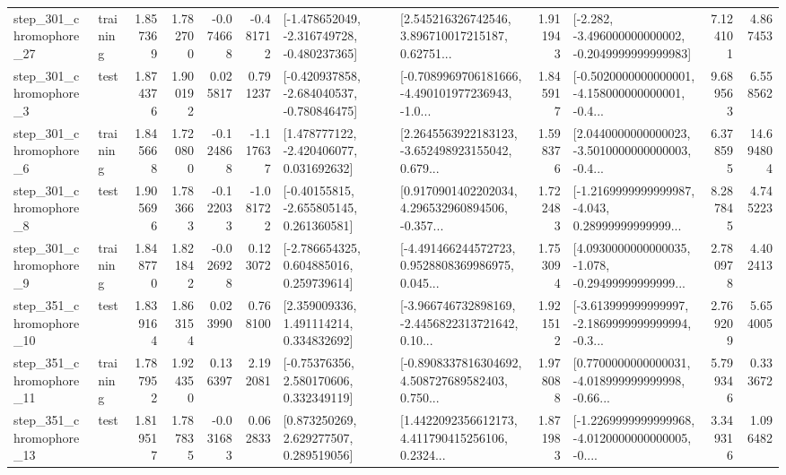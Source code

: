 \begin{tabular}{llrrrrllrlrr}
  step\_301\_chromophore\_27 &  training &      1.857369 &    1.782700 &     -0.074668 & -0.481712 &  [-1.478652049, -2.316749728, -0.480237365] &  [2.545216326742546, 3.896710017215187, 0.62751... &       1.911943 &  [-2.282, -3.496000000000002, -0.2049999999999983] &            7.124101 &          4.867453 \\
   step\_301\_chromophore\_3 &      test &      1.874376 &    1.900192 &      0.025817 &  0.791237 &  [-0.420937858, -2.684040537, -0.780846475] &  [-0.7089969706181666, -4.490101977236943, -1.0... &       1.845917 &  [-0.5020000000000001, -4.158000000000001, -0.4... &            9.689563 &          6.558562 \\
   step\_301\_chromophore\_6 &  training &      1.845668 &    1.720800 &     -0.124868 & -1.117637 &    [1.478777122, -2.420406077, 0.031692632] &  [2.2645563922183123, -3.652498923155042, 0.679... &       1.598376 &  [2.0440000000000023, -3.5010000000000003, -0.4... &            6.378595 &         14.694804 \\
   step\_301\_chromophore\_8 &      test &      1.905696 &    1.783663 &     -0.122033 & -1.081722 &    [-0.40155815, -2.655805145, 0.261360581] &  [0.9170901402202034, 4.296532960894506, -0.357... &       1.722483 &  [-1.2169999999999987, -4.043, 0.28999999999999... &            8.287845 &          4.745223 \\
   step\_301\_chromophore\_9 &  training &      1.848770 &    1.821842 &     -0.026928 &  0.123072 &    [-2.786654325, 0.604885016, 0.259739614] &  [-4.491466244572723, 0.9528808369986975, 0.045... &       1.753094 &  [4.0930000000000035, -1.078, -0.29499999999999... &            2.780978 &          4.402413 \\
  step\_351\_chromophore\_10 &      test &      1.839164 &    1.863154 &      0.023990 &  0.768100 &     [2.359009336, 1.491114214, 0.334832692] &  [-3.966746732898169, -2.4456822313721642, 0.10... &       1.921512 &  [-3.613999999999997, -2.1869999999999994, -0.3... &            2.769209 &          5.654005 \\
  step\_351\_chromophore\_11 &  training &      1.787952 &    1.924350 &      0.136397 &  2.192081 &     [-0.75376356, 2.580170606, 0.332349119] &  [-0.8908337816304692, 4.508727689582403, 0.750... &       1.978088 &  [0.7700000000000031, -4.018999999999998, -0.66... &            5.799346 &          0.333672 \\
  step\_351\_chromophore\_13 &      test &      1.819517 &    1.787835 &     -0.031683 &  0.062833 &     [0.873250269, 2.629277507, 0.289519056] &  [1.4422092356612173, 4.411790415256106, 0.2324... &       1.871983 &  [-1.2269999999999968, -4.0120000000000005, -0.... &            3.349316 &          1.096482 \\

\end{tabular}
